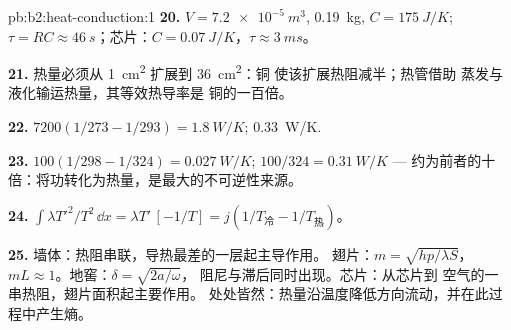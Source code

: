 \begin{solution}{pb:b2:heat-conduction:1}
\textbf{20.} $V = \qty{7.2e-5}{m^3}$, \qty{0.19}{kg}, $C = \qty{175}{J/K}$; $\tau = RC
\approx \qty{46}{s}$；芯片：$C = \qty{0.07}{J/K}$，$\tau \approx \qty{3}{ms}$。

\textbf{21.} 热量必须从 \qty{1}{cm^2} 扩展到 \qty{36}{cm^2}：铜
使该扩展热阻减半；热管借助
蒸发与液化输运热量，其等效热导率是
铜的一百倍。

\textbf{22.} $7200(1/273 - 1/293) = \qty{1.8}{W/K}$; \qty{0.33}{W/K}.

\textbf{23.} $100(1/298 - 1/324) = \qty{0.027}{W/K}$; $100/324 = \qty{0.31}{W/K}$ ---
约为前者的十倍：将功转化为热量，是最大的不可逆性来源。

\textbf{24.} $\int\lambda T'^2/T^2\,\dd x = \lambda T'\,[-1/T] = j(1/T_{\text{冷}} -
1/T_{\text{热}})$。

\textbf{25.} 墙体：热阻串联，导热最差的一层起主导作用。
翅片：$m = \sqrt{hp/\lambda S}$，$mL \approx 1$。地窖：$\delta = \sqrt{2a/\omega}$，
阻尼与滞后同时出现。芯片：从芯片到
空气的一串热阻，翅片面积起主要作用。
处处皆然：热量沿温度降低方向流动，并在此过程中产生熵。
\end{solution}
